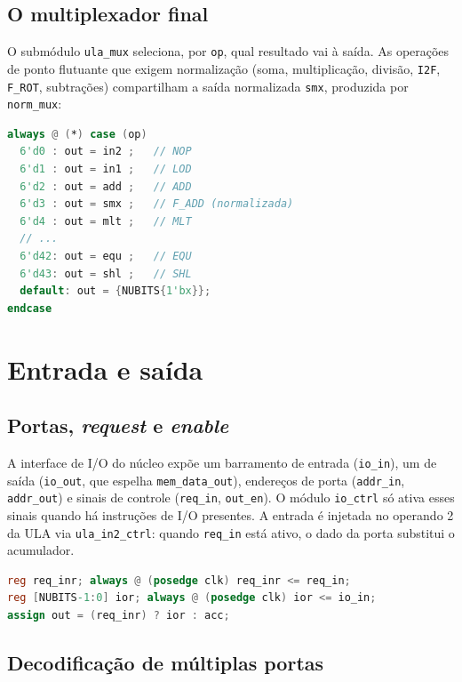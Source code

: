 \subsection{O multiplexador final}
\label{sec:arq-ula-mux}

O submódulo \lstinline|ula_mux| seleciona, por \lstinline|op|, qual resultado vai à saída. As
operações de ponto flutuante que exigem normalização (soma, multiplicação, divisão,
\lstinline|I2F|, \lstinline|F_ROT|, subtrações) compartilham a saída normalizada
\lstinline|smx|, produzida por \lstinline|norm_mux|:

\begin{lstlisting}[language=Verilog]
always @ (*) case (op)
  6'd0 : out = in2 ;   // NOP
  6'd1 : out = in1 ;   // LOD
  6'd2 : out = add ;   // ADD
  6'd3 : out = smx ;   // F_ADD (normalizada)
  6'd4 : out = mlt ;   // MLT
  // ...
  6'd42: out = equ ;   // EQU
  6'd43: out = shl ;   // SHL
  default: out = {NUBITS{1'bx}};
endcase
\end{lstlisting}

\section{Entrada e saída}
\label{sec:arq-io}

\subsection{Portas, \emph{request} e \emph{enable}}
\label{sec:arq-io-portas}

A interface de I/O do núcleo expõe um barramento de entrada (\lstinline|io_in|), um de saída
(\lstinline|io_out|, que espelha \lstinline|mem_data_out|), endereços de porta
(\lstinline|addr_in|, \lstinline|addr_out|) e sinais de controle (\lstinline|req_in|,
\lstinline|out_en|). O módulo \lstinline|io_ctrl| só ativa esses sinais quando há
instruções de I/O presentes. A entrada é injetada no operando 2 da ULA via
\lstinline|ula_in2_ctrl|: quando \lstinline|req_in| está ativo, o dado da porta substitui o
acumulador.

\begin{lstlisting}[language=Verilog]
reg req_inr; always @ (posedge clk) req_inr <= req_in;
reg [NUBITS-1:0] ior; always @ (posedge clk) ior <= io_in;
assign out = (req_inr) ? ior : acc;
\end{lstlisting}

\subsection{Decodificação de múltiplas portas}
\label{sec:arq-io-decod}

